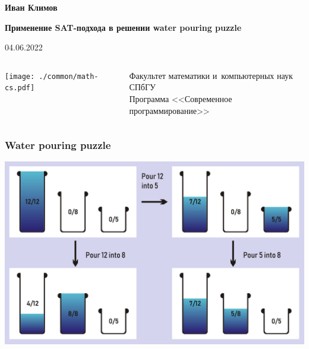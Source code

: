 \documentclass[14pt,aspectratio=169,hyperref={pdftex,unicode},xcolor=dvipsnames]{beamer}
\institute
{
  \begin{columns}
    \begin{column}{1.5cm}
    \texttt{[image: ./common/math-cs.pdf]}
    \end{column}
    \begin{column}{4cm}
          Факультет математики и компьютерных наук СПбГУ
    \end{column}
  \end{columns}
}
\begin{document}
\begin{frame}[plain]
  \begin{center}
    \textbf{Иван Климов}

    {\Large\textbf{Применение SAT-подхода в решении water pouring puzzle}}



    04.06.2022
  \end{center}


  \begin{columns}
    \begin{column}{1cm}
    \texttt{[image: ./common/math-cs.pdf]}
    \end{column}
    \begin{column}{10cm}
      \small
          Факультет математики и~компьютерных наук СПбГУ\\
          Программа <<Современное программирование>>
    \end{column}
  \end{columns}
\end{frame}



\begin{frame}
\frametitle{Water pouring puzzle}
\begin{center}
\includegraphics[scale=0.29]{water_pouring_puzzle.png}
\end{center}
\end{frame}
\end{document}
